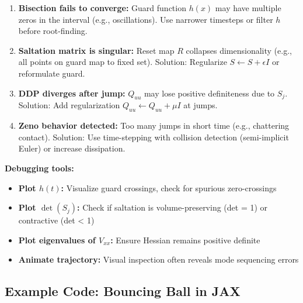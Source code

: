 \documentclass[
  letterpaper,
  DIV=11,
  numbers=noendperiod]{scrartcl}
\providecommand{\tightlist}{%
  \setlength{\itemsep}{0pt}\setlength{\parskip}{0pt}}\usepackage{longtable,booktabs,array}
\begin{document}
\begin{enumerate}
\def\labelenumi{\arabic{enumi}.}
\item
  \textbf{Bisection fails to converge:} Guard function \(h(x)\) may have
  multiple zeros in the interval (e.g., oscillations). Use narrower
  timesteps or filter \(h\) before root-finding.
\item
  \textbf{Saltation matrix is singular:} Reset map \(R\) collapses
  dimensionality (e.g., all points on guard map to fixed set). Solution:
  Regularize \(S \gets S + \epsilon I\) or reformulate guard.
\item
  \textbf{DDP diverges after jump:} \(Q_{uu}\) may lose positive
  definiteness due to \(S_j\). Solution: Add regularization
  \(Q_{uu} \gets Q_{uu} + \mu I\) at jumps.
\item
  \textbf{Zeno behavior detected:} Too many jumps in short time (e.g.,
  chattering contact). Solution: Use time-stepping with collision
  detection (semi-implicit Euler) or increase dissipation.
\end{enumerate}

\textbf{Debugging tools:}

\begin{itemize}
\tightlist
\item
  \textbf{Plot \(h(t)\):} Visualize guard crossings, check for spurious
  zero-crossings
\item
  \textbf{Plot \(\det(S_j)\):} Check if saltation is volume-preserving
  (det = 1) or contractive (det \textless{} 1)
\item
  \textbf{Plot eigenvalues of \(V_{xx}\):} Ensure Hessian remains
  positive definite
\item
  \textbf{Animate trajectory:} Visual inspection often reveals mode
  sequencing errors
\end{itemize}

\subsection{Example Code: Bouncing Ball in
JAX}\label{example-code-bouncing-ball-in-jax}
\end{document}
